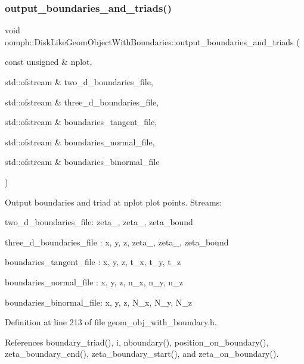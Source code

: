 \subsubsection{\texorpdfstring{output\+\_\+boundaries\+\_\+and\+\_\+triads()}{output\_boundaries\_and\_triads()}}
{\footnotesize\ttfamily void oomph\+::\+Disk\+Like\+Geom\+Object\+With\+Boundaries\+::output\+\_\+boundaries\+\_\+and\+\_\+triads (\begin{DoxyParamCaption}\item[{const unsigned \&}]{nplot,  }\item[{std\+::ofstream \&}]{two\+\_\+d\+\_\+boundaries\+\_\+file,  }\item[{std\+::ofstream \&}]{three\+\_\+d\+\_\+boundaries\+\_\+file,  }\item[{std\+::ofstream \&}]{boundaries\+\_\+tangent\+\_\+file,  }\item[{std\+::ofstream \&}]{boundaries\+\_\+normal\+\_\+file,  }\item[{std\+::ofstream \&}]{boundaries\+\_\+binormal\+\_\+file }\end{DoxyParamCaption})\hspace{0.3cm}{\ttfamily [inline]}}



Output boundaries and triad at nplot plot points. Streams\+: 


\begin{DoxyItemize}
\item two\+\_\+d\+\_\+boundaries\+\_\+file\+: zeta\+\_, zeta\+\_, zeta\+\_\+bound
\item three\+\_\+d\+\_\+boundaries\+\_\+file \+: x, y, z, zeta\+\_, zeta\+\_, zeta\+\_\+bound
\item boundaries\+\_\+tangent\+\_\+file \+: x, y, z, t\+\_\+x, t\+\_\+y, t\+\_\+z
\item boundaries\+\_\+normal\+\_\+file \+: x, y, z, n\+\_\+x, n\+\_\+y, n\+\_\+z
\item boundaries\+\_\+binormal\+\_\+file\+: x, y, z, N\+\_\+x, N\+\_\+y, N\+\_\+z 
\end{DoxyItemize}

Definition at line 213 of file geom\+\_\+obj\+\_\+with\+\_\+boundary.\+h.



References boundary\+\_\+triad(), i, nboundary(), position\+\_\+on\+\_\+boundary(), zeta\+\_\+boundary\+\_\+end(), zeta\+\_\+boundary\+\_\+start(), and zeta\+\_\+on\+\_\+boundary().



